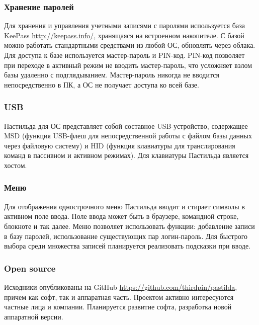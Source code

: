 \documentclass[10pt, a5paper]{article}
\begin{document}
\subsubsection*{Хранение паролей}

Для хранения и управления учетными записями с паролями используется база KeePass \url{http://keepass.info/}, хранящаяся на встроенном накопителе. С базой можно работать стандартными средствами из любой ОС, обновлять через облака. 
Для доступа к базе используется мастер-пароль и PIN-код. PIN-код позволяет при переходе в активный режим не вводить мастер-пароль, что усложняет взлом базы удаленно с подглядыванием. Мастер-пароль никогда не вводится непосредственно в ПК, а ОС не получает доступа ко всей базе.

\subsubsection*{USB}

Пастильда для ОС представляет собой составное USB-устройст\-во, содержащее MSD (функция USB-флеш для непосредственной работы с файлом базы данных через файловую систему) и HID (функция клавиатуры для транслирования команд в пассивном и активном режимах). Для клавиатуры Пастильда является хостом.

\subsubsection*{Меню}

Для отображения однострочного меню Пастильда вводит и стирает символы в активном поле ввода. Поле ввода может быть в браузере, командной строке, блокноте и так далее. Меню позволяет использовать функции: добавление записи в базу паролей, использование существующих пар логин-пароль. Для быстрого выбора среди множества записей планируется реализовать подсказки при вводе.

\subsubsection*{Open source}

Исходники опубликованы на GitHub \url{https://github.com/}\linebreak\url{thirdpin/pastilda}, причем как софт, так и аппаратная часть. Проектом активно интересуются частные лица и компании. Планируется развитие софта, разработка новой аппаратной версии.
\end{document}
